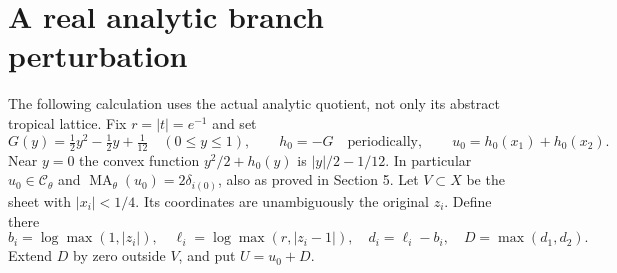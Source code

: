 \documentclass[11pt]{article}
\theoremstyle{definition}\newtheorem{definition}[theorem]{Definition}
\newcommand{\MA}{\operatorname{MA}}
\begin{document}
\section{A real analytic branch perturbation}
The following calculation uses the actual analytic quotient, not only its
abstract tropical lattice. Fix $r=|t|=e^{-1}$ and set
\[
 G(y)=\tfrac12y^2-\tfrac12y+\tfrac1{12}\quad (0\le y\le1),
 \qquad h_0=-G\quad\text{periodically},
 \qquad u_0=h_0(x_1)+h_0(x_2).                            \tag{4.1}
\]
Near $y=0$ the convex function $y^2/2+h_0(y)$ is $|y|/2-1/12$.
In particular $u_0\in\mathcal C_\theta$ and
$\MA_\theta(u_0)=2\delta_{i(0)}$, also as proved in Section 5.
Let $V\subset X$ be the sheet with $|x_i|<1/4$. Its coordinates are
unambiguously the original $z_i$. Define there
\[
 b_i=\log\max(1,|z_i|),\quad
 \ell_i=\log\max(r,|z_i-1|),\quad d_i=\ell_i-b_i,\quad
 D=\max(d_1,d_2).                                       \tag{4.2}
\]
Extend $D$ by zero outside $V$, and put $U=u_0+D$.
\end{document}
